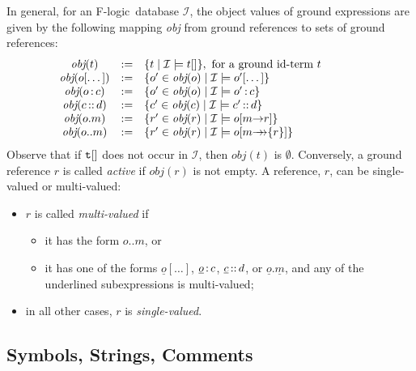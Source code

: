 \documentclass[11pt]{article}
\newcommand{\obj}{\textit{obj}\xspace}
\newcommand{\db}[1]{\ensuremath{\mathcal{#1}}}
\newcommand{\isa}{\,{\bf{:}}\,}
\newcommand{\subcl}{\,{\bf{::}}\,}
\newcommand{\fd}{\ensuremath{{\rightarrow}}}                   %
\newcommand{\mvd}{\ensuremath{{\rightarrow\!\!\!\!\rightarrow}}}  %
\newcommand{\fl}{{F-logic}\xspace}
\begin{document}
In general, for an \fl\ database \db I, the object values of ground
expressions are given by the following mapping \obj from ground references
to sets of ground references:
%
\begin{displaymath}
  \begin{array}{cll@{\hspace{4em}}c}
    \obj(t) & := & \{t \mid  \db I\models t[] \}, 
     \textrm{ for a ground id-term $t$}  \\   
    \obj(o[\dots]) & :=& \{o'\in\obj(o) \mid \db I \models o'[\dots]
    \} \\  
    \obj(o\isa c) & := & \{o'\in\obj(o) \mid \db I \models o'\isa c\}
     \\ 
    \obj(c\subcl d) & := & \{c'\in\obj(c) \mid \db I \models c'\subcl
    d\} \\ 
    \obj(o.m) & :=  & \{r'\in\obj(r) \mid \db I \models o[m\fd
    r]\} \\ 
    \obj(o..m) & := &  \{ r'\in\obj(r) \mid \db I \models
    o[m{\mvd}\{r\}] \}
  \end{array}
\end{displaymath}
Observe that if $\tt t[]$ does not occur in \db{I}, then $\obj(t)$ is
$\emptyset$.  Conversely, a ground reference $r$ is called \emph{active} if
$\obj(r)$ is not empty. A reference, $r$, can be 
single-valued or multi-valued:
\begin{itemize}
\item $r$ is called \emph{multi-valued} if
 \begin{itemize}
  \item it has the form $o..m$, or 
  \item it has one of the forms $\underline{o}[\dots]$,
    $\underline{o}\isa c$, $\underline{c}\subcl d$, or
    $\underline{o}.\underline{m}$, and any of the underlined
    subexpressions is multi-valued;
 \end{itemize}
\item in all other cases, $r$ is \emph{single-valued}.
\end{itemize}


\subsection{Symbols, Strings, Comments}


\end{document}

